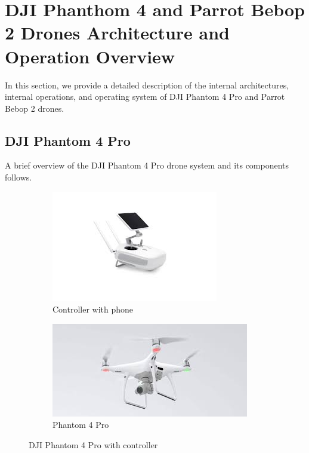 \documentclass[conference]{IEEEtran}
\begin{document}
\section{DJI Phanthom 4 and Parrot Bebop 2 Drones Architecture and Operation Overview}\label{System Overview}
In this section, we provide a detailed description of the internal architectures, internal operations, and operating system of DJI Phantom 4 Pro and  Parrot Bebop 2 drones. 


\subsection{DJI Phantom 4 Pro}
 A brief overview of the DJI Phantom 4 Pro drone system and its components follows. 
\begin{figure}[h!]
	\centering
	\begin{subfigure}{.23\textwidth}
		\centering
		\includegraphics[width=0.9\linewidth]{rc}
		\caption{Controller with phone}
	\end{subfigure}
	\begin{subfigure}{.23\textwidth}
		\centering
		\includegraphics[height=0.11\textheight, width=0.9\linewidth]{drone}
		\caption{Phantom 4 Pro}
	\end{subfigure}
		\caption{DJI Phantom 4 Pro with controller}
		\label{fig:Phantom4}
\end{figure}
\end{document}
